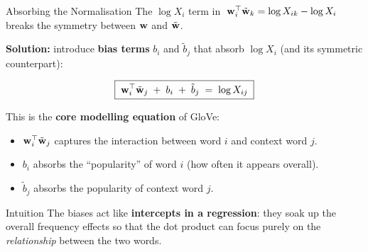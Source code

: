\documentclass[11pt,aspectratio=169,professionalfonts]{beamer}
\begin{document}
\begin{frame}{Absorbing the Normalisation}
  The $\log X_i$ term in $\;\mathbf{w}_i^\top \tilde{\mathbf{w}}_k = \log X_{ik} - \log X_i\;$ breaks the symmetry between $\mathbf{w}$ and $\tilde{\mathbf{w}}$.

  \vspace{8pt}
  \textbf{Solution:} introduce \textbf{bias terms} $b_i$ and $\tilde{b}_j$ that absorb $\log X_i$ (and its symmetric counterpart):

  \vspace{6pt}
  \[
    \boxed{\;\mathbf{w}_i^\top \tilde{\mathbf{w}}_j \;+\; b_i \;+\; \tilde{b}_j \;=\; \log X_{ij}\;}
  \]

  \vspace{6pt}
  This is the \textbf{core modelling equation} of GloVe:
  \begin{itemize}
    \item $\mathbf{w}_i^\top \tilde{\mathbf{w}}_j$ captures the interaction between word $i$ and context word $j$.
    \item $b_i$ absorbs the ``popularity'' of word $i$ (how often it appears overall).
    \item $\tilde{b}_j$ absorbs the popularity of context word $j$.
  \end{itemize}

  \vspace{6pt}
  \begin{block}{Intuition}
    The biases act like \textbf{intercepts in a regression}: they soak up the overall frequency effects so that the dot product can focus purely on the \emph{relationship} between the two words.
  \end{block}
\end{frame}
%
%
\end{document}
